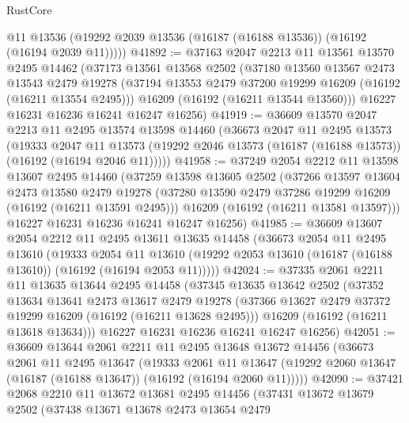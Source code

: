\begin{lexlean}{RustCore}
\begin{coremodule}
        @11
        @13536
        (@19292 @2039 @13536 (@16187 (@16188 @13536)) (@16192 (@16194 @2039 @11)))))
@41892 := @37163
    @2047
    @2213
    @11
    @13561
    @13570
    @2495
    @14462
    (@37173
      @13561
      @13568
      @2502
      (@37180
        @13560
        @13567
        @2473
        @13543
        @2479
        @19278
        (@37194 @13553 @2479 @37200 @19299 @16209 (@16192 (@16211 @13554 @2495)))
        @16209
        (@16192 (@16211 @13544 @13560)))
      @16227
      @16231
      @16236
      @16241
      @16247
      @16256)
@41919 := @36609
    @13570
    @2047
    @2213
    @11
    @2495
    @13574
    @13598
    @14460
    (@36673
      @2047
      @11
      @2495
      @13573
      (@19333
        @2047
        @11
        @13573
        (@19292 @2046 @13573 (@16187 (@16188 @13573)) (@16192 (@16194 @2046 @11)))))
@41958 := @37249
    @2054
    @2212
    @11
    @13598
    @13607
    @2495
    @14460
    (@37259
      @13598
      @13605
      @2502
      (@37266
        @13597
        @13604
        @2473
        @13580
        @2479
        @19278
        (@37280 @13590 @2479 @37286 @19299 @16209 (@16192 (@16211 @13591 @2495)))
        @16209
        (@16192 (@16211 @13581 @13597)))
      @16227
      @16231
      @16236
      @16241
      @16247
      @16256)
@41985 := @36609
    @13607
    @2054
    @2212
    @11
    @2495
    @13611
    @13635
    @14458
    (@36673
      @2054
      @11
      @2495
      @13610
      (@19333
        @2054
        @11
        @13610
        (@19292 @2053 @13610 (@16187 (@16188 @13610)) (@16192 (@16194 @2053 @11)))))
@42024 := @37335
    @2061
    @2211
    @11
    @13635
    @13644
    @2495
    @14458
    (@37345
      @13635
      @13642
      @2502
      (@37352
        @13634
        @13641
        @2473
        @13617
        @2479
        @19278
        (@37366 @13627 @2479 @37372 @19299 @16209 (@16192 (@16211 @13628 @2495)))
        @16209
        (@16192 (@16211 @13618 @13634)))
      @16227
      @16231
      @16236
      @16241
      @16247
      @16256)
@42051 := @36609
    @13644
    @2061
    @2211
    @11
    @2495
    @13648
    @13672
    @14456
    (@36673
      @2061
      @11
      @2495
      @13647
      (@19333
        @2061
        @11
        @13647
        (@19292 @2060 @13647 (@16187 (@16188 @13647)) (@16192 (@16194 @2060 @11)))))
@42090 := @37421
    @2068
    @2210
    @11
    @13672
    @13681
    @2495
    @14456
    (@37431
      @13672
      @13679
      @2502
      (@37438
        @13671
        @13678
        @2473
        @13654
        @2479

\end{coremodule}
\end{lexlean}
